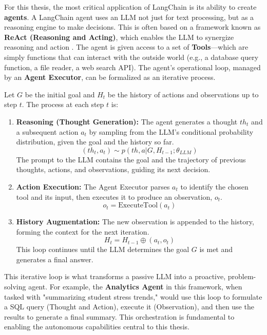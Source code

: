 For this thesis, the most critical application of LangChain is its ability to create \textbf{agents}. A LangChain agent uses an LLM not just for text processing, but as a reasoning engine to make decisions. This is often based on a framework known as \textbf{ReAct (Reasoning and Acting)}, which enables the LLM to synergize reasoning and action \cite{FIND_CITATION_PLEASE}. The agent is given access to a set of \textbf{Tools}—which are simply functions that can interact with the outside world (e.g., a database query function, a file reader, a web search API). The agent's operational loop, managed by an \textbf{Agent Executor}, can be formalized as an iterative process.

Let $G$ be the initial goal and $H_t$ be the history of actions and observations up to step $t$. The process at each step $t$ is:
\begin{enumerate}
    \item \textbf{Reasoning (Thought Generation):} The agent generates a thought $th_t$ and a subsequent action $a_t$ by sampling from the LLM's conditional probability distribution, given the goal and the history so far.
    $$ (th_t, a_t) \sim p(th, a | G, H_{t-1}; \theta_{LLM}) $$
    The prompt to the LLM contains the goal and the trajectory of previous thoughts, actions, and observations, guiding its next decision.

    \item \textbf{Action Execution:} The Agent Executor parses $a_t$ to identify the chosen tool and its input, then executes it to produce an observation, $o_t$.
    $$ o_t = \text{ExecuteTool}(a_t) $$

    \item \textbf{History Augmentation:} The new observation is appended to the history, forming the context for the next iteration.
    $$ H_t = H_{t-1} \oplus (a_t, o_t) $$
    This loop continues until the LLM determines the goal $G$ is met and generates a final answer.
\end{enumerate}
This iterative loop is what transforms a passive LLM into a proactive, problem-solving agent. For example, the \textbf{Analytics Agent} in this framework, when tasked with "summarizing student stress trends," would use this loop to formulate a SQL query (Thought and Action), execute it (Observation), and then use the results to generate a final summary. This orchestration is fundamental to enabling the autonomous capabilities central to this thesis.

